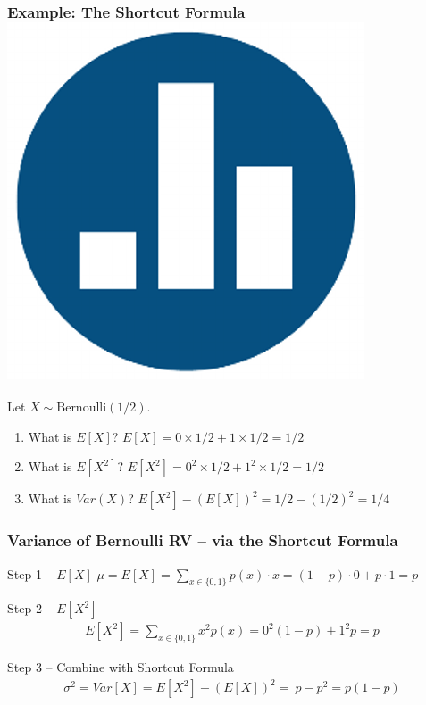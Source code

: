 \documentclass[handout]{beamer}
\begin{document}
\begin{frame}
\frametitle{Example: The Shortcut Formula \hfill \includegraphics[scale = 0.05]{./images/clicker}}
Let $X\sim \mbox{Bernoulli}(1/2)$.
\begin{enumerate}
  \item What is $E[X]$? \hspace{1em} \pause \alert{$E[X] = 0 \times 1/2 + 1 \times 1/2 = 1/2$} \pause
    \item What is $E[X^2]$? \pause \hspace{1em} \alert{$E[X^2] = 0^2 \times 1/2 + 1^2 \times 1/2 = 1/2$} \pause
    \item What is $Var(X)$? \pause \hspace{1em} \alert{$E[X^2] - \left( E[X] \right)^2 = 1/2 - (1/2)^2 = 1/4$} 
\end{enumerate}
\end{frame}


\begin{frame}
\frametitle{Variance of Bernoulli RV -- via the Shortcut Formula}

\begin{block}{Step 1 -- $E[X]$} 
$\mu = E[X] = \displaystyle \sum_{x \in \{0,1\}} p(x) \cdot x = (1-p) \cdot 0 + p \cdot 1 = p$
\end{block}


\begin{block}{Step 2 -- $E[X^2]$} 
\begin{eqnarray*}
	E[X^2] = \sum_{x \in \{0,1\}} x^2 p(x) = 0^2 (1-p) + 1^2 p = p
\end{eqnarray*}
\end{block}


\begin{block}{Step 3 -- Combine with Shortcut Formula} 
\begin{eqnarray*}
	\sigma^2 = Var[X] = E[X^2] - \left(E[X]\right)^2 = \ p - p^2 =  p(1-p)
\end{eqnarray*}
\end{block}


\end{frame}
\end{document}
